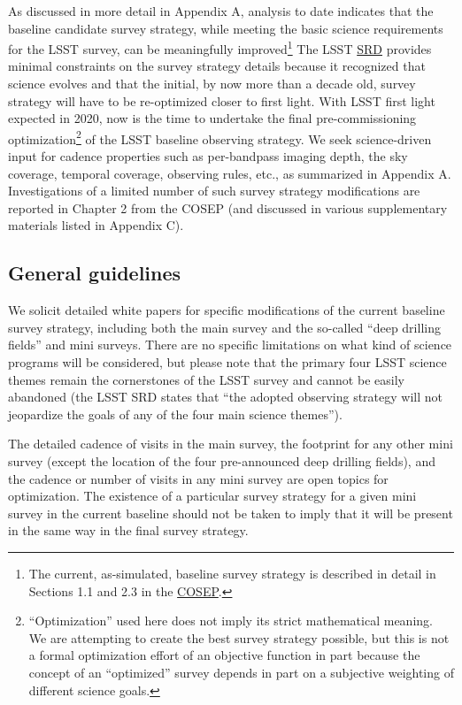 \documentclass[DM,lsstdraft,toc,usenatbib]{lsstdoc}
\begin{document}
As discussed in more detail in Appendix A, analysis to date indicates that the baseline candidate
survey strategy, while meeting the basic science requirements for the LSST survey, can be meaningfully 
improved\footnote{The current, as-simulated, baseline survey strategy is described in detail in Sections 1.1 
and 2.3 in the \href{http://ls.st/o5k}{COSEP}.}
The LSST \href{http://ls.st/srd}{SRD}
provides minimal constraints on the survey strategy details because it recognized that science evolves and that the 
initial, by now more than a decade old, survey strategy will have to be re-optimized closer to first 
light. With LSST first light expected in 2020, now is the time to undertake the final pre-commissioning
optimization\footnote{``Optimization'' used here does not imply its strict mathematical meaning. 
We are attempting to create the best survey strategy possible, but this is not a formal optimization 
effort of an objective function in part because the concept of an ``optimized'' survey depends in part on a subjective
weighting of different science goals.} 
of the LSST baseline observing strategy. We seek science-driven input for cadence 
properties such as per-bandpass imaging depth, the sky coverage, temporal coverage, observing
rules, etc., as summarized in Appendix A. Investigations of a limited number of such survey strategy 
modifications are reported in Chapter 2 from the COSEP (and discussed 
in various supplementary materials listed in Appendix C). 


\subsection{General guidelines} 

We solicit detailed white papers for specific modifications of the current baseline survey strategy, including 
both the main survey and the so-called ``deep drilling fields'' and mini surveys. There are no 
specific limitations on what kind of science programs will be considered, but please note that 
the primary four LSST science themes remain the cornerstones of the LSST survey and cannot 
be easily abandoned (the LSST SRD states that ``the adopted observing 
strategy will not jeopardize the goals of any of the four main science themes'').  

The detailed cadence of visits in the main survey, the footprint for any other mini survey (except the location of the four pre-announced
deep drilling fields), and the cadence or number of visits in any mini survey are open topics for optimization. The existence of a 
particular survey strategy for a given mini survey in the current baseline should not be taken to imply that it will be present in the same way in the final 
survey strategy. 
\end{document}

